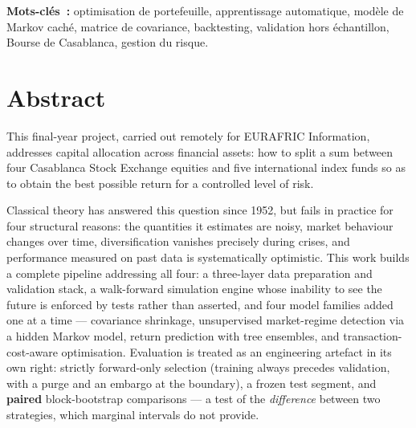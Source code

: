 \vspace{0.6em}
\noindent\textbf{Mots-clés~:} optimisation de portefeuille, apprentissage
automatique, modèle de Markov caché, matrice de covariance, backtesting,
validation hors échantillon, Bourse de Casablanca, gestion du risque.

\normalsize

\chapter*{Abstract}
\enlargethispage{3\baselineskip}

This final-year project, carried out remotely for EURAFRIC Information, addresses capital
allocation across financial assets: how to split a sum between four Casablanca
Stock Exchange equities and five international index funds so as to obtain the
best possible return for a controlled level of risk.

Classical theory has answered this question since 1952, but fails in practice for
four structural reasons: the quantities it estimates are noisy, market behaviour
changes over time, diversification vanishes precisely during crises, and
performance measured on past data is systematically optimistic. This work builds
a complete pipeline addressing all four: a three-layer data preparation and
validation stack, a walk-forward simulation engine whose inability to see the
future is enforced by tests rather than asserted, and four model families added
one at a time — covariance shrinkage, unsupervised market-regime detection via a
hidden Markov model, return prediction with tree ensembles, and
transaction-cost-aware optimisation. Evaluation is treated as an engineering
artefact in its own right: strictly forward-only selection (training always
precedes validation, with a purge and an embargo at the boundary), a frozen test
segment, and \textbf{paired} block-bootstrap comparisons — a test of the
\emph{difference} between two strategies, which marginal intervals do not provide.

